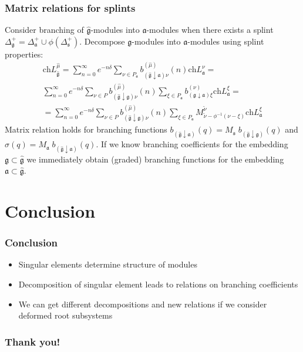 \documentclass[pdftex]{beamer}
\newcommand{\gf}{\mathfrak{g}}
\newcommand{\gfh}{\hat{\mathfrak{g}}}
\newcommand{\af}{\mathfrak{a}}
\newcommand{\sfr}{\mathfrak{s}}
\theoremstyle{definition} \newtheorem{Def}{Definition}
\begin{document}
\begin{frame}
    \frametitle{Matrix relations for splints}
Consider branching of  $\gfh$-modules into  $\af$-modules when there exists a splint
$\Delta^{+}_{\gf}=\Delta^{+}_{\af}\cup \phi(\Delta^{+}_{\sfr})$.
Decompose  $\gf$-modules into 
$\af$-modules using splint properties:
\begin{multline}
  \label{eq:125}
  \mathrm{ch}L^{\hat{\mu}}_{\gfh}=
\sum_{n=0}^{\infty}e^{-n\delta} \sum_{\nu\in P_{\af}} b^{(\hat{\mu})}_{(\gfh\downarrow\af)\nu}(n) \mathrm{ch} L^{\nu}_{\af}=\\
\sum_{n=0}^{\infty} e^{-n\delta} \sum_{\nu\in P} b^{(\hat{\mu})}_{(\gfh\downarrow\gf )\nu}(n) \sum_{\xi\in P_{\af}} b^{(\nu)}_{(\gf\downarrow \af) \xi}\mathrm{ch} L^{\xi}_{\af}=\\
=\sum_{n=0}^{\infty} e^{-n\delta} \sum_{\nu\in P} b^{(\hat{\mu})}_{(\gfh\downarrow\gf )\nu}(n) \sum_{\xi\in P_{\af}} M^{\widetilde{\nu}}_{  \widetilde{\nu}-\phi^{-1}( \nu-\xi )}\mathrm{ch} L^{\xi}_{\af}
\end{multline}
Matrix relation holds for branching functions $b_{(\gfh\downarrow\af)}(q)= M_{\sfr}\;
b_{(\gfh\downarrow\gf)}(q)$ and
$\sigma(q)=M_{\af}\; b_{(\gfh\downarrow\af)}(q)$.  If we know branching coefficients for the embedding $\gf\subset\gfh$ we immediately obtain (graded) branching functions for the embedding $\af\subset \gfh$.
\end{frame}


\section{Conclusion}


\begin{frame}
  \frametitle{Conclusion}
  \begin{itemize}
  \item Singular elements determine structure of modules
  \item Decomposition of singular element leads to relations on branching coefficients
  \item We can get different decompositions and new relations if we consider deformed root subsystems
  \end{itemize}
\end{frame}
\begin{frame}
  \frametitle{Thank you!}
\end{frame}
\end{document}
